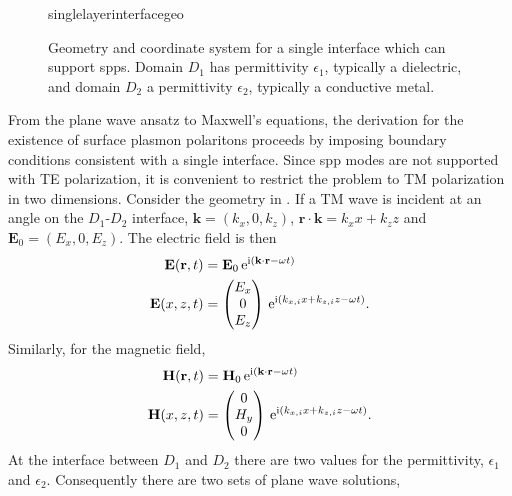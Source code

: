 \begin{figure}[ht]
 \centering
 {singlelayerinterfacegeo}
	\caption{Geometry and coordinate system for a single interface which can
support \glspl{spp}.  Domain $D_1$ has permittivity $\epsilon_1$, typically a
dielectric, and domain $D_2$ a permittivity $\epsilon_2$, typically a
conductive metal.}
\label{fig:singleinterfacegeo}
\end{figure}

From the plane wave ansatz to Maxwell's equations, the
derivation for the existence of surface plasmon polaritons proceeds
by imposing boundary conditions consistent with a single
interface.  Since \gls{spp} modes are not supported with TE polarization, it is
convenient to restrict the problem to TM polarization in two dimensions.
Consider the geometry in .  If
a TM wave is incident at an angle on the $D_1$-$D_2$ interface,
$\mathbf{k}=(k_x,0,k_z)$,
$\mathbf{r}\cdot\mathbf{k}=k_x x + k_z z$ and $\mathbf{E}_0 = (E_x, 0,
E_z)$. The electric field is then
\begin{align}
\mathbf{E} ( \mathbf{r}, t ) &= \mathbf{E}_0\, {\mathrm{e}}^{{\mathrm{i}} (\mathbf{k}
\cdot \mathbf{r} - \omega t )}\\
\mathbf{E}(x,z,t)&=\begin{pmatrix}
E_x\\ 0\\ E_z
\end{pmatrix}
\, {\mathrm{e}}^{{\mathrm{i}}(k_{x,i}x+k_{z,i}z-\omega t)}.
\label{eqn:planewavexz}
\end{align}
Similarly, for the magnetic field,
\begin{align}
\mathbf{H} ( \mathbf{r}, t ) &= \mathbf{H}_0\, {\mathrm{e}}^{{\mathrm{i}} (\mathbf{k}
\cdot \mathbf{r} - \omega t )}\\
\mathbf{H}(x,z,t)&=\begin{pmatrix}
0\\ H_y\\ 0
\end{pmatrix}
\, {\mathrm{e}}^{{\mathrm{i}}(k_{x,i}x+k_{z,i}z-\omega t)}.
\end{align}
At the interface between $D_1$ and $D_2$ there are two values for the permittivity,
$\epsilon_1$ and $\epsilon_2$.  Consequently there are two sets of plane
wave solutions,
